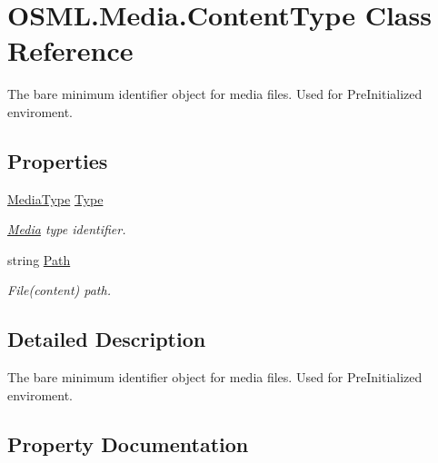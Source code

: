 \hypertarget{classOSML_1_1Media_1_1ContentType}{}\section{O\+S\+M\+L.\+Media.\+Content\+Type Class Reference}
\label{classOSML_1_1Media_1_1ContentType}


The bare minimum identifier object for media files. Used for Pre\+Initialized enviroment.  


\subsection*{Properties}
\begin{DoxyCompactItemize}
\item 
\mbox{\hyperlink{namespaceOSML_1_1Media_aa3e4261aa5181fcc93920ffe409e8b02}{Media\+Type}} \mbox{\hyperlink{classOSML_1_1Media_1_1ContentType_a62715596eaea8956f5df45e74b157a45}{Type}}
\begin{DoxyCompactList}\small\item\em \mbox{\hyperlink{classOSML_1_1Media_1_1Media}{Media}} type identifier. \end{DoxyCompactList}\item 
string \mbox{\hyperlink{classOSML_1_1Media_1_1ContentType_af8f4fcd54414521db832b23e13822a56}{Path}}
\begin{DoxyCompactList}\small\item\em File(content) path. \end{DoxyCompactList}\end{DoxyCompactItemize}


\subsection{Detailed Description}
The bare minimum identifier object for media files. Used for Pre\+Initialized enviroment. 



\subsection{Property Documentation}
\mbox{\label{classOSML_1_1Media_1_1ContentType_af8f4fcd54414521db832b23e13822a56}} 
